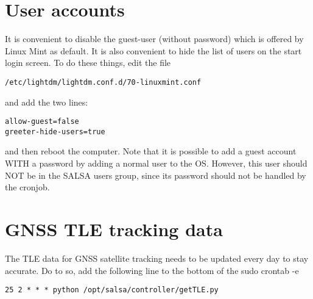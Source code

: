 \section{User accounts}
It is convenient to disable the guest-user (without password) which is offered
by Linux Mint as default. It is also convenient to hide the list of
users on the start login screen. To do these things, edit the file
\begin{verbatim}
/etc/lightdm/lightdm.conf.d/70-linuxmint.conf
\end{verbatim}
and add the two lines:
\begin{verbatim}
allow-guest=false
greeter-hide-users=true
\end{verbatim}
and then reboot the computer.
Note that it is possible to add a guest account WITH a password by adding a
normal user to the OS. However, this user should NOT be in the SALSA users
group, since its password should not be handled by the cronjob.

\section{GNSS TLE tracking data}
The TLE data for GNSS satellite tracking needs to be updated every day
to stay accurate. Do to so, add the following line to the bottom of
the sudo crontab -e
\begin{verbatim}
25 2 * * * python /opt/salsa/controller/getTLE.py
\end{verbatim}
